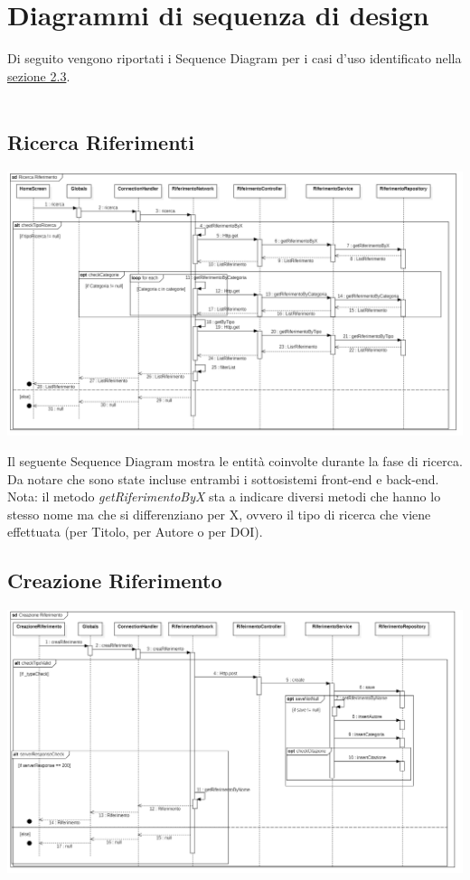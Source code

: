 {\raggedright{\section{Diagrammi di sequenza di design}}
Di seguito vengono riportati i Sequence Diagram per i casi d'uso identificato nella \hyperref[casiUso]{sezione 2.3}. \\~\\
\raggedright{\subsection{Ricerca Riferimenti}}
        \begin{center}
            \includegraphics[width=1.0\textwidth]{Immagini/Alexandria/SequenceDesignRicerca.PNG} 
        \end{center}
Il seguente Sequence Diagram mostra le entità coinvolte durante la fase di ricerca. Da notare che sono state incluse entrambi i sottosistemi front-end e back-end. Nota: il metodo \textit{getRiferimentoByX} sta a indicare diversi metodi che hanno lo stesso nome ma che si differenziano per X, ovvero il tipo di ricerca che viene effettuata (per Titolo, per Autore o per DOI).
\raggedright{\subsection{Creazione Riferimento}}
        \begin{center}
            \includegraphics[width=1.0\textwidth]{Immagini/Alexandria/SequenceDesignCreazione.PNG} 

\end{center}}
